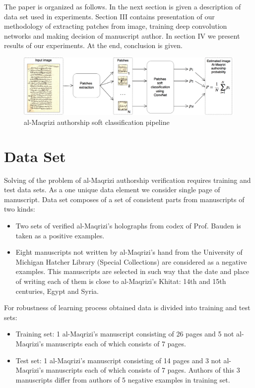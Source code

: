 \documentclass[conference,a4paper,twocolumn]{IEEEtran}
\begin{document}
The paper is organized as follows. In the next section is given a description of data set used in experiments. Section III contains presentation of our methodology of extracting patches from image, training deep convolution networks and making decision of manuscript author. In section IV we present results of our experiments. At the end, conclusion is given.  
	

\begin{figure}[!t]
	\center
  \includegraphics[width=\textwidth]{figures/Al-Maqrizi_classification_pipeline.png}
  \caption{al-Maqrizi authorship soft classification pipeline}
  \label{fig:pipeline}
\end{figure}	
	
\section{Data Set}
\label{sec:the_data}

Solving of the problem of al-Maqrizi authorship verification requires training and test data sets. As a one unique data element we consider single page of manuscript. Data set composes of a set of consistent parts from manuscripts of two kinds:
\begin{itemize}
	\item Two sets of verified al-Maqrizi's holographs from codex of Prof. Bauden is taken as a positive examples.
	\item Eight manuscripts not written by al-Maqrizi's hand from the University of Michigan Hatcher Library (Special Collections) are considered as a negative examples. This manuscripts are selected in such way that the date and place of writing each of them is close to al-Maqrizi's Khitat: 14th and 15th centuries, Egypt and Syria.
\end{itemize}
For robustness of learning process obtained data is divided into training and test sets:
\begin{itemize}
	\item Training set: 1 al-Maqrizi's manuscript consisting of 26 pages and 5 not al-Maqrizi's manuscripts each of which consists of 7 pages.
	\item Test set: 1 al-Maqrizi's manuscript consisting of 14 pages and 3 not al-Maqrizi's manuscripts each of which consists of 7 pages. Authors of this 3 manuscripts differ from authors of 5 negative examples in training set.   
\end{itemize}
\end{document}
